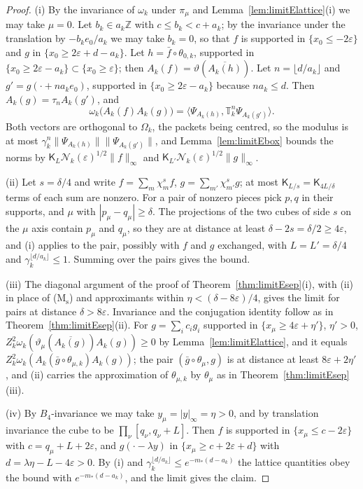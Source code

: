 \documentclass[aps,prd,twocolumn,superscriptaddress,nofootinbib,longbibliography,floatfix,amsmath,amssymb,10pt]{revtex4-2}
\theoremstyle{definition}
\theoremstyle{remark}
\newcommand{\Z}{\mathbb{Z}}
\newcommand{\ip}[2]{\langle #1,#2\rangle}
\begin{document}
\begin{proof}
(i) By the invariance of $\omega_k$ under $\pi_\mu$ and
Lemma~\ref{lem:limitElattice}(i) we may take $\mu=0$. Let $b_k\in a_k\Z$
with $c\le b_k<c+a_k$; by the invariance under the translation by
$-b_ke_0/a_k$ we may take $b_k=0$, so that $f$ is supported in $\{x_0\le
-2\varepsilon\}$ and $g$ in $\{x_0\ge2\varepsilon+d-a_k\}$. Let $h=\bar f
\circ\theta_{0,k}$, supported in $\{x_0\ge2\varepsilon-a_k\}\subset\{x_0\ge
\varepsilon\}$; then $A_k(f)=\vartheta(\overline{A_k(h)})$. Let $n=\lfloor
d/a_k\rfloor$ and $g'=g(\cdot+na_ke_0)$, supported in $\{x_0\ge2\varepsilon
-a_k\}$ because $na_k\le d$. Then $A_k(g)=\tau_nA_k(g')$, and
\[
\omega_k\bigl(A_k(f)A_k(g)\bigr)=\ip{\Psi_{A_k(h)}}{\mathbb T_k^n
\Psi_{A_k(g')}} .
\]
Both vectors are orthogonal to $\Omega_k$, the packets being centred, so the
modulus is at most $\gamma_k^n\|\Psi_{A_k(h)}\|\|\Psi_{A_k(g')}\|$, and
Lemma~\ref{lem:limitEbox} bounds the norms by $\mathsf K_L\mathcal N_k(
\varepsilon)^{1/2}\|f\|_\infty$ and $\mathsf K_{L'}\mathcal N_k(\varepsilon)
^{1/2}\|g\|_\infty$.

(ii) Let $s=\delta/4$ and write $f=\sum_m\chi^s_mf$, $g=\sum_{m'}\chi^s_{m'}
g$; at most $\mathsf K_{L/s}=\mathsf K_{4L/\delta}$ terms of each sum are
nonzero. For a pair of nonzero pieces pick $p,q$ in their supports, and
$\mu$ with $|p_\mu-q_\mu|\ge\delta$. The projections of the two cubes of
side $s$ on the $\mu$ axis contain $p_\mu$ and $q_\mu$, so they are at
distance at least $\delta-2s=\delta/2\ge4\varepsilon$, and (i) applies to
the pair, possibly with $f$ and $g$ exchanged, with $L=L'=\delta/4$ and
$\gamma_k^{\lfloor d/a_k\rfloor}\le1$. Summing over the pairs gives the bound.

(iii) The diagonal argument of the proof of
Theorem~\ref{thm:limitEsep}(i), with (ii) in place of
(M$_{\mathrm s}$) and approximants within $\eta<(\delta-8\varepsilon)/4$,
gives the limit for pairs at distance $\delta>8\varepsilon$. Invariance and
the conjugation identity follow as in Theorem~\ref{thm:limitEsep}(ii). For
$g=\sum_ic_ig_i$ supported in $\{x_\mu\ge4\varepsilon+\eta'\}$, $\eta'>0$,
$Z_k^2\omega_k(\vartheta_\mu(\overline{A_k(g)})A_k(g))\ge0$ by
Lemma~\ref{lem:limitElattice}, and it equals $Z_k^2\omega_k(A_k(\bar g\circ
\theta_{\mu,k})A_k(g))$; the pair $(\bar g\circ\theta_\mu,g)$ is at distance
at least $8\varepsilon+2\eta'$, and (ii) carries the approximation of
$\theta_{\mu,k}$ by $\theta_\mu$ as in Theorem~\ref{thm:limitEsep}(iii).

(iv) By $B_4$-invariance we may take $y_\mu=|y|_\infty=\eta>0$, and by
translation invariance the cube to be $\prod_\nu[q_\nu,q_\nu+L]$. Then $f$
is supported in $\{x_\mu\le c-2\varepsilon\}$ with $c=q_\mu+L+2\varepsilon$,
and $g(\cdot-\lambda y)$ in $\{x_\mu\ge c+2\varepsilon+d\}$ with $d=\lambda
\eta-L-4\varepsilon>0$. By (i) and $\gamma_k^{\lfloor d/a_k\rfloor}\le
e^{-m_*(d-a_k)}$ the lattice quantities obey the bound with
$e^{-m_*(d-a_k)}$, and the limit gives the claim.


\end{proof}
\end{document}
